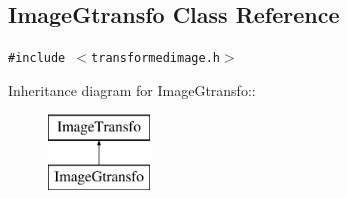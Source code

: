 \subsection{Image\-Gtransfo  Class Reference}
\label{class_imagegtransfo}
{\tt \#include $<$transformedimage.h$>$}

Inheritance diagram for Image\-Gtransfo::\begin{figure}[H]
\begin{center}
\leavevmode
\includegraphics[height=2cm]{class_imagegtransfo}
\end{center}
\end{figure}
